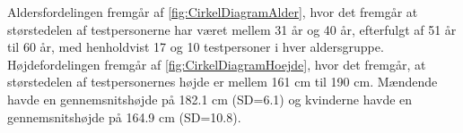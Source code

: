 \noindent
%
Aldersfordelingen fremgår af \autoref{fig:CirkelDiagramAlder}, hvor det fremgår at størstedelen af testpersonerne har været mellem 31 år og 40 år, efterfulgt af 51 år til 60 år, med henholdvist 17 og 10 testpersoner i hver aldersgruppe. Højdefordelingen fremgår af \autoref{fig:CirkelDiagramHoejde}, hvor det fremgår, at størstedelen af testpersonernes højde er mellem 161 cm til 190 cm. Mændende havde en gennemsnitshøjde på 182.1 cm (SD=6.1) og kvinderne havde en gennemsnitshøjde på 164.9 cm (SD=10.8). 